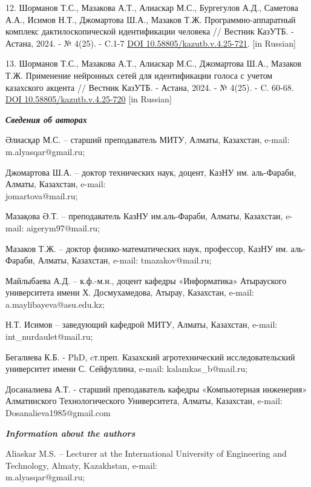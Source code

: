 \begin{references}
12. Шорманов Т.С., Мазакова А.Т., Алиаскар М.С., Бургегулов А.Д.,
Саметова А.А., Исимов Н.Т., Джомартова Ш.А., Мазаков Т.Ж.
Программно-аппаратный комплекс дактилоскопической идентификации человека
// Вестник КазУТБ. - Астана, 2024. - № 4(25). - C.1-7
\href{https://doi.org/10.58805/kazutb.v.4.25-721}{DOI
10.58805/kazutb.v.4.25-721}. {[}in Russian{]}

13. Шорманов Т.С., Мазакова А.Т., Алиаскар М.С., Джомартова Ш.А., Мазаков
Т.Ж. Применение нейронных сетей для идентификации голоса с учетом
казахского акцента // Вестник КазУТБ. - Астана, 2024. - № 4(25). - C.
60-68. \href{https://doi.org/10.58805/kazutb.v.4.25-720}{DOI 10.58805/kazutb.v.4.25-720}
{[}in Russian{]}
\end{references}

\begin{authorinfo}
\hspace{1em}\emph{{\bfseries Сведения об авторах}}

Әлиасқар М.С. -- старший преподаватель МИТУ, Алматы, Казахстан, e-mail:
m.alyasqar@gmail.ru;

Джомартова Ш.А. -- доктор технических наук, доцент, КазНУ им.
аль-Фараби, Алматы, Казахстан, e-mail: \\jomartova@mail.ru;

Мазақова Ә.Т. -- преподаватель КазНУ им.аль-Фараби, Алматы, Казахстан,
e-mail: aigerym97@mail.ru;

Мазаков Т.Ж. -- доктор физико-математических наук, профессор, КазНУ им.
аль-Фараби, Алматы, Казахстан, e-mail: tmazakov@mail.ru;

Майлыбаева А.Д. -- к.ф.-м.н., доцент кафедры «Информатика» Атырауского
университета имени Х. Досмухамедова, Атырау, Казахстан, e-mail:
a.maylibayeva@asu.edu.kz;

Н.Т. Исимов -- заведующий кафедрой МИТУ, Алматы, Казахстан, e-mail:
int\_nurdaulet@mail.ru;

Бегалиева К.Б. - PhD, cт.преп. Казахский агротехнический
исследовательский университет имени С. Сейфуллина, e-mail:
kalamkas\_b@mail.ru;

Досаналиева А.Т. - старший преподаватель кафедры «Компьютерная инженерия»
Алматинского Технологического Университета, Алматы, Казахстан, e-mail:
Dosanalieva1985@gmail.com

\hspace{1em}\emph{{\bfseries Information about the authors}}

Aliaskar M.S. -- Lecturer at the International University of Engineering
and Technology, Almaty, Kazakhstan, e-mail: \\m.alyasqar@gmail.ru;


\end{authorinfo}
